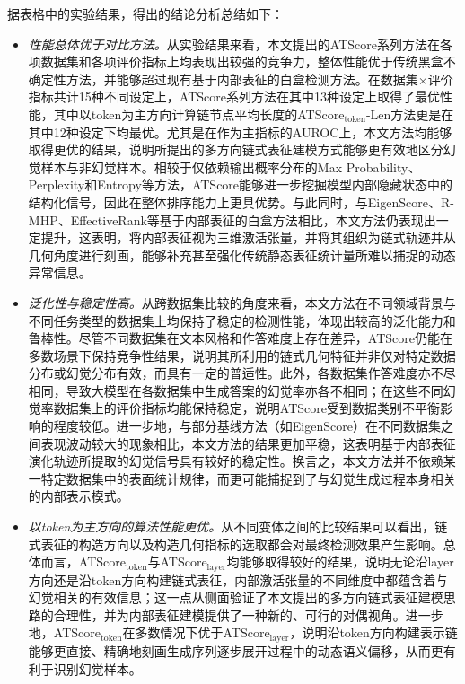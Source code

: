 据表格中的实验结果，得出的结论分析总结如下：

\begin{itemize}
  \item \emph{性能总体优于对比方法。}从实验结果来看，本文提出的ATScore系列方法在各项数据集和各项评价指标上均表现出较强的竞争力，整体性能优于传统黑盒不确定性方法，并能够超过现有基于内部表征的白盒检测方法。在数据集$\times$评价指标共计15种不同设定上，ATScore系列方法在其中13种设定上取得了最优性能，其中以token为主方向计算链节点平均长度的ATScore$_{\mathrm{token}}$-Len方法更是在其中12种设定下均最优。尤其是在作为主指标的AUROC上，本文方法均能够取得更优的结果，说明所提出的多方向链式表征建模方式能够更有效地区分幻觉样本与非幻觉样本。相较于仅依赖输出概率分布的Max Probability、Perplexity和Entropy等方法，ATScore能够进一步挖掘模型内部隐藏状态中的结构化信号，因此在整体排序能力上更具优势。与此同时，与EigenScore、R-MHP、EffectiveRank等基于内部表征的白盒方法相比，本文方法仍表现出一定提升，这表明，将内部表征视为三维激活张量，并将其组织为链式轨迹并从几何角度进行刻画，能够补充甚至强化传统静态表征统计量所难以捕捉的动态异常信息。
  \item \emph{泛化性与稳定性高。}从跨数据集比较的角度来看，本文方法在不同领域背景与不同任务类型的数据集上均保持了稳定的检测性能，体现出较高的泛化能力和鲁棒性。尽管不同数据集在文本风格和作答难度上存在差异，ATScore仍能在多数场景下保持竞争性结果，说明其所利用的链式几何特征并非仅对特定数据分布或幻觉分布有效，而具有一定的普适性。此外，各数据集作答难度亦不尽相同，导致大模型在各数据集中生成答案的幻觉率亦各不相同；在这些不同幻觉率数据集上的评价指标均能保持稳定，说明ATScore受到数据类别不平衡影响的程度较低。进一步地，与部分基线方法（如EigenScore）在不同数据集之间表现波动较大的现象相比，本文方法的结果更加平稳，这表明基于内部表征演化轨迹所提取的幻觉信号具有较好的稳定性。换言之，本文方法并不依赖某一特定数据集中的表面统计规律，而更可能捕捉到了与幻觉生成过程本身相关的内部表示模式。
  \item \emph{以token为主方向的算法性能更优。}从不同变体之间的比较结果可以看出，链式表征的构造方向以及构造几何指标的选取都会对最终检测效果产生影响。总体而言，ATScore$_{\mathrm{token}}$与ATScore$_{\mathrm{layer}}$均能够取得较好的结果，说明无论沿layer方向还是沿token方向构建链式表征，内部激活张量的不同维度中都蕴含着与幻觉相关的有效信息；这一点从侧面验证了本文提出的多方向链式表征建模思路的合理性，并为内部表征建模提供了一种新的、可行的对偶视角。进一步地，ATScore$_{\mathrm{token}}$在多数情况下优于ATScore$_{\mathrm{layer}}$，说明沿token方向构建表示链能够更直接、精确地刻画生成序列逐步展开过程中的动态语义偏移，从而更有利于识别幻觉样本。

\end{itemize}
